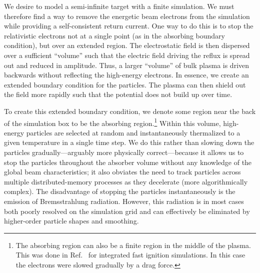 \documentclass[../absorber.tex]{subfiles}
\begin{document}
We desire to model a semi-infinite target with a finite simulation.  We must therefore find a way to remove the energetic beam electrons from the simulation while providing a self-consistent return current.  One way to do this is to stop the relativistic electrons not at a single point (as in the absorbing boundary condition), but over an extended region.  The electrostatic field is then dispersed over a sufficient ``volume'' such that the electric field driving the reflux is spread out and reduced in amplitude. Thus, a larger ``volume'' of bulk plasma is driven backwards without reflecting the high-energy electrons.  In essence, we create an extended boundary condition for the particles.  The plasma can then shield out the field more rapidly such that the potential does not build up over time.

To create this extended boundary condition, we denote some region near the back of the simulation box to be the absorbing region.\footnote
{
 The absorbing region can also be a finite region in the middle of the plasma.  This was done in Ref.~ for integrated fast ignition simulations.  In this case the electrons were slowed gradually by a drag force.
}
Within this volume, high-energy particles are selected at random and instantaneously thermalized to a given temperature in a single time step.  We do this rather than slowing down the particles gradually---arguably more physically correct---because it allows us to stop the particles throughout the absorber volume without any knowledge of the global beam characteristics; it also obviates the need to track particles across multiple distributed-memory processes as they decelerate (more algorithmically complex).  The disadvantage of stopping the particles instantaneously is the emission of Bremsstrahlung radiation.\cite{Allen1973AstrophysicalQuantities}  However, this radiation is in most cases both poorly resolved on the simulation grid and can effectively be eliminated by higher-order particle shapes and smoothing.
\end{document}
